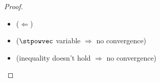 \begin{proof}
  \begin{itemize}
    \item ($\Leftarrow$)
    \item ($\stpowvec$ variable $\Rightarrow$ no convergence)
    \item (inequality doesn't hold $\Rightarrow$ no convergence)
  \end{itemize}
\end{proof}
